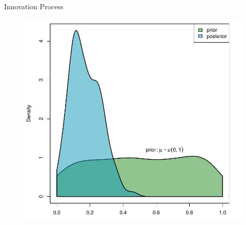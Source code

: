 \documentclass[12pt, notes=show]{beamer}
\begin{document}
	\begin{frame}{Innovation Process}

	    \begin{figure}[H]
		\begin{center}
		    \includegraphics[height=.8\textheight]{ABC.jpg}
		\end{center}
	    \end{figure}
	    

	\end{frame}
\end{document}
